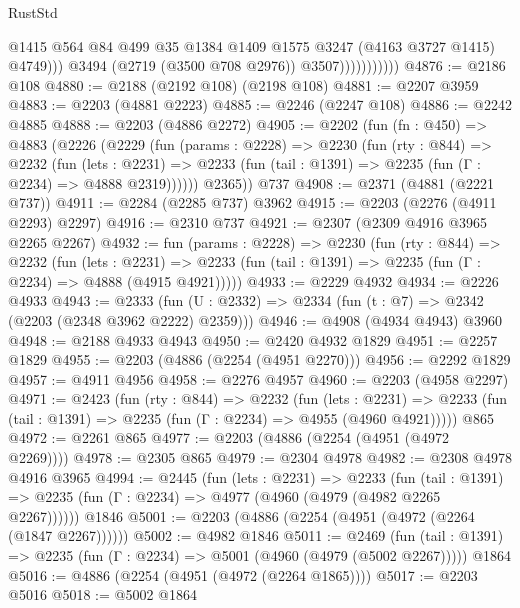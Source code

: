 \begin{lexlean}{RustStd}
\begin{coremodule}
                                @1415
                                @564
                                @84
                                @499
                                @35
                                @1384
                                @1409
                                @1575
                                @3247
                                (@4163 @3727 @1415)
                                @4749)))
                          @3494
                          (@2719 (@3500 @708 @2976))
                          @3507)))))))))))
@4876 := @2186 @108
@4880 := @2188 (@2192 @108) (@2198 @108)
@4881 := @2207 @3959
@4883 := @2203 (@4881 @2223)
@4885 := @2246 (@2247 @108)
@4886 := @2242 @4885
@4888 := @2203 (@4886 @2272)
@4905 := @2202
    (fun (fn : @450) =>
    @4883
      (@2226
        (@2229
          (fun (params : @2228) =>
          @2230
            (fun (rty : @844) =>
            @2232
              (fun (lets : @2231) =>
              @2233 (fun (tail : @1391) => @2235 (fun (Γ : @2234) => @4888 @2319))))))
        @2365))
    @737
@4908 := @2371 (@4881 (@2221 @737))
@4911 := @2284 (@2285 @737) @3962
@4915 := @2203 (@2276 (@4911 @2293) @2297)
@4916 := @2310 @737
@4921 := @2307 (@2309 @4916 @3965 @2265 @2267)
@4932 := fun (params : @2228) =>
  @2230
    (fun (rty : @844) =>
    @2232
      (fun (lets : @2231) =>
      @2233 (fun (tail : @1391) => @2235 (fun (Γ : @2234) => @4888 (@4915 @4921)))))
@4933 := @2229 @4932
@4934 := @2226 @4933
@4943 := @2333 (fun (U : @2332) => @2334 (fun (t : @7) => @2342 (@2203 (@2348 @3962 @2222) @2359)))
@4946 := @4908 (@4934 @4943) @3960
@4948 := @2188 @4933 @4943
@4950 := @2420 @4932 @1829
@4951 := @2257 @1829
@4955 := @2203 (@4886 (@2254 (@4951 @2270)))
@4956 := @2292 @1829
@4957 := @4911 @4956
@4958 := @2276 @4957
@4960 := @2203 (@4958 @2297)
@4971 := @2423
    (fun (rty : @844) =>
    @2232
      (fun (lets : @2231) =>
      @2233 (fun (tail : @1391) => @2235 (fun (Γ : @2234) => @4955 (@4960 @4921)))))
    @865
@4972 := @2261 @865
@4977 := @2203 (@4886 (@2254 (@4951 (@4972 @2269))))
@4978 := @2305 @865
@4979 := @2304 @4978
@4982 := @2308 @4978 @4916 @3965
@4994 := @2445
    (fun (lets : @2231) =>
    @2233
      (fun (tail : @1391) => @2235 (fun (Γ : @2234) => @4977 (@4960 (@4979 (@4982 @2265 @2267))))))
    @1846
@5001 := @2203 (@4886 (@2254 (@4951 (@4972 (@2264 (@1847 @2267))))))
@5002 := @4982 @1846
@5011 := @2469
    (fun (tail : @1391) => @2235 (fun (Γ : @2234) => @5001 (@4960 (@4979 (@5002 @2267)))))
    @1864
@5016 := @4886 (@2254 (@4951 (@4972 (@2264 @1865))))
@5017 := @2203 @5016
@5018 := @5002 @1864

\end{coremodule}
\end{lexlean}
